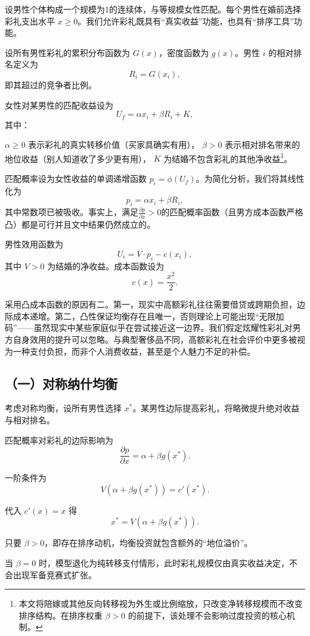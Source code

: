 \documentclass[11pt, a4paper, UTF8]{chinese-erj}
\begin{document}
设男性个体构成一个规模为1的连续体，与等规模女性匹配。每个男性在婚前选择彩礼支出水平 $x \ge 0$。我们允许彩礼既具有“真实收益”功能，也具有“排序工具”功能。

设所有男性彩礼的累积分布函数为 $G(x)$，密度函数为 $g(x)$。男性 $i$ 的相对排名定义为
\[
R_i = G(x_i),
\]
即其超过的竞争者比例。

女性对某男性的匹配收益设为
\[
U_f = \alpha x_i + \beta R_i + K,
\]
其中：

$\alpha \ge 0$ 表示彩礼的真实转移价值（买家具确实有用），  
$\beta > 0$ 表示相对排名带来的地位收益（别人知道收了多少更有用），  
$K$ 为结婚不包含彩礼的其他净收益\footnote{本文将陪嫁或其他反向转移视为外生或比例缩放，只改变净转移规模而不改变排序结构。在排序权重 $\beta>0$ 的前提下，该处理不会影响过度投资的核心机制。}。

匹配概率设为女性收益的单调递增函数 $p_i=\phi(U_f)$。为简化分析，我们将其线性化为
\[
p_i = \alpha x_i + \beta R_i,
\]
其中常数项已被吸收。事实上，满足$\frac{\partial p}{\partial x}>0$的匹配概率函数（且男方成本函数严格凸）都是可行并且文中结果仍然成立的。

男性效用函数为
\[
U_i = V \cdot p_i - c(x_i),
\]
其中 $V>0$ 为结婚的净收益。成本函数设为
\[
c(x) = \frac{x^2}{2}.
\]

采用凸成本函数的原因有二。第一，现实中高额彩礼往往需要借贷或跨期负担，边际成本递增。第二，凸性保证均衡存在且唯一，否则理论上可能出现“无限加码”——虽然现实中某些家庭似乎在尝试接近这一边界。我们假定炫耀性彩礼对男方自身效用的提升可以忽略。与典型奢侈品不同，高额彩礼在社会评价中更多被视为一种支付负担，而非个人消费收益，甚至是个人魅力不足的补偿。



\subsection*{（一）对称纳什均衡}

考虑对称均衡，设所有男性选择 $x^*$。某男性边际提高彩礼，将略微提升绝对收益与相对排名。

匹配概率对彩礼的边际影响为
\[
\frac{\partial p}{\partial x} = \alpha + \beta g(x^*).
\]

一阶条件为
\[
V(\alpha + \beta g(x^*)) = c'(x^*).
\]

代入 $c'(x)=x$ 得
\[
x^* = V(\alpha + \beta g(x^*)).
\]

只要 $\beta>0$，即存在排序动机，均衡投资就包含额外的“地位溢价”。

当 $\beta=0$ 时，模型退化为纯转移支付情形，此时彩礼规模仅由真实收益决定，不会出现军备竞赛式扩张。
\end{document}

